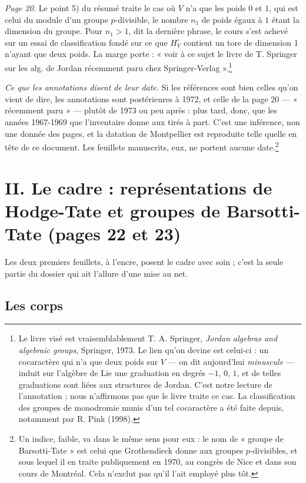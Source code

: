 \documentclass[11pt,a4paper]{article}
\begin{document}
\emph{Page 20.} Le point 5) du résumé traite le cas où $V$ n'a que les poids
$0$ et $1$, qui est celui du module d'un groupe $p$-divisible, le nombre $n_1$
de poids égaux à $1$ étant la dimension du groupe. Pour $n_1 > 1$, dit la
dernière phrase, le cours s'est achevé sur un essai de classification fondé
sur ce que $H_V^{\circ}$ contient un tore de dimension 1 n'ayant que deux
poids. La marge porte : « voir à ce sujet le livre de T. Springer sur les
alg. de Jordan récemment paru chez Springer-Verlag ».\footnote{Le livre visé
est vraisemblablement T. A. Springer, \emph{Jordan algebras and algebraic
groups}, Springer, 1973. Le lien qu'on devine est celui-ci : un cocaractère
qui n'a que deux poids sur $V$ --- on dit aujourd'hui \emph{minuscule} ---
induit sur l'algèbre de Lie une graduation en degrés $-1$, $0$, $1$, et de
telles graduations sont liées aux structures de Jordan. C'est notre lecture de
l'annotation ; nous n'affirmons pas que le livre traite ce cas. La
classification des groupes de monodromie munis d'un tel cocaractère a été
faite depuis, notamment par R. Pink (1998).}

\emph{Ce que les annotations disent de leur date.} Si les références sont
bien celles qu'on vient de dire, les annotations sont postérieures à 1972, et
celle de la page 20 --- « récemment paru » --- plutôt de 1973 ou peu après :
plus tard, donc, que les années 1967-1969 que l'inventaire donne aux
tirés à part. C'est une inférence, non une donnée des pages, et la datation
de Montpellier est reproduite telle quelle en tête de ce document. Les
feuillets manuscrits, eux, ne portent aucune date.\footnote{Un indice, faible,
va dans le même sens pour eux : le nom de « groupe de Barsotti-Tate » est
celui que Grothendieck donne aux groupes $p$-divisibles, et sous lequel il en
traite publiquement en 1970, au congrès de Nice et dans son cours de
Montréal. Cela n'exclut pas qu'il l'ait employé plus tôt.}

\section*{II. Le cadre : représentations de Hodge-Tate et groupes de Barsotti-Tate (pages 22 et 23)}

Les deux premiers feuillets, à l'encre, posent le cadre avec soin ; c'est la
seule partie du dossier qui ait l'allure d'une mise au net.

\subsection*{Les corps}
\end{document}
